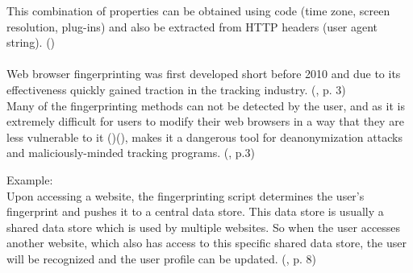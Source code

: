 This combination of properties can be obtained using code (time zone, screen resolution, plug-ins) and also be extracted from HTTP headers (user agent string). (\textcite{miele18}) \\\\
Web browser fingerprinting was first developed short before 2010 and due to its effectiveness quickly gained traction in the tracking industry. (\textcite{havens16}, p. 3) \\
Many of the fingerprinting methods can not be detected by the user, and as it is extremely difficult for users to modify their web browsers in a way that they are less vulnerable to it (\textcite{amiunique})(\textcite{miele18}), makes it a dangerous tool for deanonymization attacks and maliciously-minded tracking programs. (\textcite{havens16}, p.3)\\
\begin{tcolorbox}
Example:\\
Upon accessing a website, the fingerprinting script determines the user's fingerprint and pushes it to a central data store. This data store is usually a shared data store which is used by multiple websites. So when the user accesses another website, which also has access to this specific shared data store, the user will be recognized and the user profile can be updated. (\textcite{havens16}, p. 8)
\end{tcolorbox}

